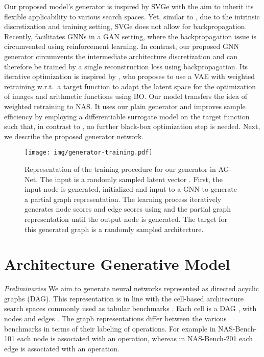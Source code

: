 \documentclass[runningheads]{llncs}
\begin{document}
Our proposed model's generator is inspired by SVGe with the aim to inherit its flexible applicability to various search spaces. Yet, similar to \cite{2020Arch2vec}, due to the intrinsic discretization and training setting, SVGe does not allow for backpropagation. 
Recently, \cite{2021GANAS} facilitates GNNs in a GAN \cite{2014GAN} setting, where the backpropagation issue is circumvented using reinforcement learning. 
In contrast, our proposed GNN generator circumvents the intermediate architecture discretization and can therefore be trained by a single reconstruction loss using backpropagation.
Its iterative optimization is inspired by \cite{2020Reweighting}, who proposes to use a VAE with weighted retraining w.r.t.~a target function to adapt the latent space for the optimization of images and arithmetic functions using BO. Our model transfers the idea of weighted retraining to NAS. It uses our plain generator and improves sample efficiency by employing a differentiable surrogate model on the target function such that, in contrast to \cite{2020Reweighting}, no further black-box optimization step is needed. Next, we describe the proposed generator network.




\begin{figure}[t!]

    \centering
    \texttt{[image: img/generator-training.pdf]}
    \caption{Representation of the training procedure for our generator in AG-Net. The input is a randomly sampled latent vector . First, the input node is generated, initialized and input to a GNN to generate a partial graph representation. The learning process iteratively generates node scores and edge scores using  and the partial graph representation until the output node is generated. The target for this generated graph is a randomly sampled architecture.    
    }
    \label{fig:generator-training}
\end{figure}

\section{Architecture Generative Model}
\noindent \textit{Preliminaries}
We aim to generate neural networks represented as directed acyclic graphs (DAG).
This representation is in line with the cell-based architecture search spaces commonly used as tabular benchmarks \cite{2019NB101,2020NB201}.
Each cell is a DAG , with nodes  and edges .
The graph representations differ between the various benchmarks in terms of their labeling of operations.
For example in NAS-Bench-101 \cite{2019NB101} each node is associated with an operation, whereas in NAS-Bench-201 \cite{2020NB201} each edge is associated with an operation.
\end{document}
